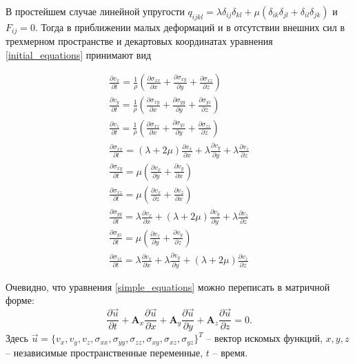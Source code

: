 В простейшем случае линейной упругости $q_{ijkl}=\lambda\delta_{ij}\delta_{kl}+\mu(\delta_{ik}\delta_{jl}+\delta_{il}\delta_{jk})$ и $F_{ij}=0$. Тогда в приближении малых деформаций и в отсутствии внешних сил в трехмерном пространстве и декартовых координатах уравнения \ref{initial_equations} принимают вид

\begin{eqnarray}
\label{simple_equations}
\frac{\partial{v_x}}{\partial{t}}=\frac{1}{\rho}(\frac{\partial{\sigma_{xx}}}{\partial{x}}+\frac{\partial{\sigma_{xy}}}{\partial{y}}+\frac{\partial{\sigma_{xz}}}{\partial{z}})
\nonumber\\
\frac{\partial{v_y}}{\partial{t}}=\frac{1}{\rho}(\frac{\partial{\sigma_{xy}}}{\partial{x}}+\frac{\partial{\sigma_{yy}}}{\partial{y}}+\frac{\partial{\sigma_{yz}}}{\partial{z}})
\nonumber\\
\frac{\partial{v_z}}{\partial{t}}=\frac{1}{\rho}(\frac{\partial{\sigma_{xz}}}{\partial{x}}+\frac{\partial{\sigma_{yz}}}{\partial{y}}+\frac{\partial{\sigma_{zz}}}{\partial{z}})
\nonumber\\
\frac{\partial{\sigma_{xx}}}{\partial{t}}=(\lambda+2\mu)\frac{\partial{v_x}}{\partial{x}}+\lambda\frac{\partial{v_y}}{\partial{y}}+\lambda\frac{\partial{v_z}}{\partial{z}}
\nonumber\\
\frac{\partial{\sigma_{xy}}}{\partial{t}}=\mu(\frac{\partial{v_x}}{\partial{y}}+\frac{\partial{v_y}}{\partial{x}})
\nonumber\\
\frac{\partial{\sigma_{xz}}}{\partial{t}}=\mu(\frac{\partial{v_x}}{\partial{z}}+\frac{\partial{v_z}}{\partial{x}})
\nonumber\\
\frac{\partial{\sigma_{yy}}}{\partial{t}}=\lambda\frac{\partial{v_x}}{\partial{x}}+(\lambda+2\mu)\frac{\partial{v_y}}{\partial{y}}+\lambda\frac{\partial{v_z}}{\partial{z}}
\nonumber\\
\frac{\partial{\sigma_{yz}}}{\partial{t}}=\mu(\frac{\partial{v_z}}{\partial{y}}+\frac{\partial{v_y}}{\partial{z}})
\nonumber\\
\frac{\partial{\sigma_{zz}}}{\partial{t}}=\lambda\frac{\partial{v_x}}{\partial{x}}+\lambda\frac{\partial{v_y}}{\partial{y}}+(\lambda+2\mu)\frac{\partial{v_z}}{\partial{z}}
\end{eqnarray}

Очевидно, что уравнения \ref{simple_equations} можно переписать в матричной форме:
\begin{equation}
\label{simple_matrix_equation}
\frac{\partial\vec{u}}{\partial{t}}+\mathbf{A}_x\frac{\partial\vec{u}}{\partial{x}}+
\mathbf{A}_y\frac{\partial\vec{u}}{\partial{y}}+
\mathbf{A}_z\frac{\partial\vec{u}}{\partial{z}}=0.
\end{equation}
Здесь
$\vec{u}=\{v_x,v_y,v_z,\sigma_{xx},\sigma_{yy},\sigma_{zz},\sigma_{xy},\sigma_{xz},\sigma_{yz}\}^T$
-- вектор искомых функций, $x,y,z$ --  независимые пространственные переменные, $t$ -- время.

